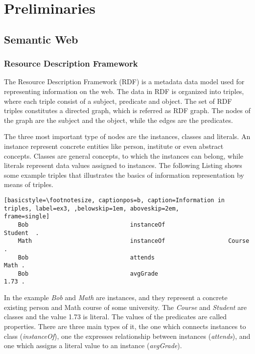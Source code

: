\chapter{Preliminaries}

\section{Semantic Web}

\subsection{Resource Description Framework}


The Resource Description Framework (RDF) is a metadata data model used for representing information on the web. The data in RDF is organized into triples, where each triple consist of a subject, predicate and object. The set of RDF triples constitutes a directed graph, which is referred as RDF graph. The nodes of the graph are the subject and the object, while the edges are the predicates.

The three most important type of nodes are the instances, classes and literals. An instance represent concrete entities like person, institute or even abstract concepts. Classes are general concepts, to which the instances can belong, while literals represent data values assigned to instances. The following Listing shows some example triples that illustrates the basics of information representation by means of triples.

\begin{lstlisting}[basicstyle=\footnotesize, captionpos=b, caption=Information in triples, label=ex3, ,belowskip=1em, aboveskip=2em,
frame=single]
	Bob								instanceOf					Student  .
	Math							instanceOf					Course . 		
	Bob								attends							Math . 		
	Bob								avgGrade						1.73 .
\end{lstlisting}

In the example \textit{Bob} and \textit{Math} are instances, and they represent a concrete existing person and Math course of some university. The \textit{Course} and \textit{Student} are classes and the value 1.73 is literal. The values of the predicates are called properties. There are three main types of it, the one which connects instances to class (\textit{instanceOf}), one the expresses relationship between instances (\textit{attends}), and one which assigns a literal value to an instance (\textit{avgGrade}). 



